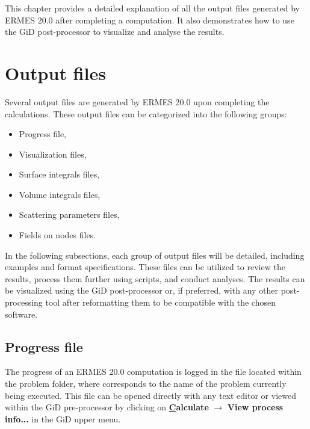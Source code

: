 %
%

This chapter provides a detailed explanation of all the output files generated by ERMES 20.0 after completing a computation. It also demonstrates how to use the GiD post-processor to visualize and analyse the results.

\section{Output files}

Several output files are generated by ERMES 20.0 upon completing the calculations. These output files can be categorized into the following groups:
\begin{itemize}\itemsep0em 
	\item Progress file,
	\item Visualization files,
	\item Surface integrals files,
	\item Volume integrals files,
	\item Scattering parameters files,
	\item Fields on nodes files.
\end{itemize}
In the following subsections, each group of output files will be detailed, including examples and format specifications. These files can be utilized to review the results, process them further using scripts, and conduct analyses. The results can be visualized using the GiD post-processor or, if preferred, with any other post-processing tool after reformatting them to be compatible with the chosen software.

\subsection{Progress file}\label{ssInfoFile}

The progress of an ERMES 20.0 computation is logged in the  file located within the problem folder, where  corresponds to the name of the problem currently being executed. This file can be opened directly with any text editor or 
viewed within the GiD pre-processor by clicking on \textbf{\underline{C}alculate} $\rightarrow$ \textbf{View process info...} in the GiD upper menu.

